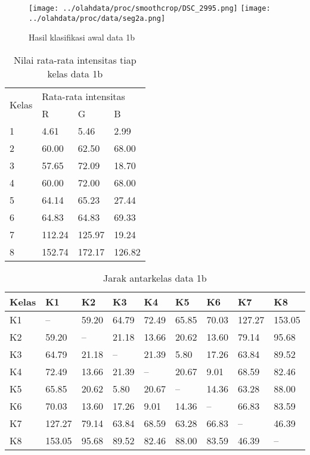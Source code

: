 \documentclass[laporan.tex]{subfiles}
\begin{document}
\begin{figure}[h!]
\centering
\texttt{[image: ../olahdata/proc/smoothcrop/DSC\_2995.png]}
\texttt{[image: ../olahdata/proc/data/seg2a.png]}
\caption{Hasil klasifikasi awal data 1b}
\end{figure}

\begin{table}[h!]
\centering
\begin{tabular}{|l|l|l|l|}
\cline{1-4}
\multirow{2}{*}{Kelas} & \multicolumn{3}{l|}{Rata-rata intensitas} \\
\cline{2-4}
 & R & G & B \\
\cline{1-4}
1 & 4.61 & 5.46 & 2.99 \\
2 & 60.00 & 62.50 & 68.00 \\
3 & 57.65 & 72.09 & 18.70 \\
4 & 60.00 & 72.00 & 68.00 \\
5 & 64.14 & 65.23 & 27.44 \\
6 & 64.83 & 64.83 & 69.33 \\
7 & 112.24 & 125.97 & 19.24 \\
8 & 152.74 & 172.17 & 126.82 \\
\cline{1-4}
\end{tabular}
\caption{Nilai rata-rata intensitas tiap kelas data 1b}
\label{table:avglow1}
\end{table}

\begin{table}[h!]
\centering
\begin{tabular}{|l|l|l|l|l|l|l|l|l|}
\hline
Kelas & K1 & K2 & K3 & K4 & K5 & K6 & K7 & K8 \\
\hline
K1 & -- & 59.20 & 64.79 & 72.49 & 65.85 & 70.03 & 127.27 & 153.05 \\
K2 & 59.20 & -- & 21.18 & 13.66 & 20.62 & 13.60 & 79.14 & 95.68 \\
K3 & 64.79 & 21.18 & --	& 21.39 & 5.80 & 17.26 & 63.84 & 89.52 \\
K4 & 72.49 & 13.66 & 21.39 & --	& 20.67 & 9.01 & 68.59 & 82.46 \\
K5 & 65.85 & 20.62 & 5.80 & 20.67 & -- & 14.36 & 63.28 & 88.00 \\
K6 & 70.03 & 13.60 & 17.26 & 9.01 & 14.36 & -- & 66.83 & 83.59 \\
K7 & 127.27 & 79.14 & 63.84 & 68.59 & 63.28 & 66.83 & -- & 46.39 \\
K8 & 153.05 & 95.68 & 89.52 & 82.46 & 88.00 & 83.59 & 46.39 & -- \\
\hline
\end{tabular}
\caption{Jarak antarkelas data 1b}
\label{table:distlow}
\end{table}
\end{document}
